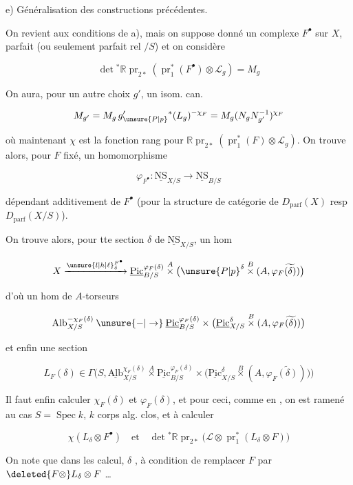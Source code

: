 
e) Généralisation des constructions précédentes.

On revient aux conditions de a), mais on suppose donné un complexe  $F^{\bullet}$ sur $X$,  parfait (ou seulement parfait rel $/S$) et on considère

\[
\det{}^{*}\mathbb R\operatorname{pr}_{2*}(\operatorname{pr}_1^{*}(F^{\bullet})\otimes\mathscr L_g)=M_g
\]

On aura, pour un autre choix $g'$,  un isom. can.

\[
M_{g'}=M_g\,g'_{\unsure{P|p}}{}^{*}(L_g)^{-\chi_F}=M_g(N_gN_{g'}^{-1})^{\chi_F}
\]

où maintenant $\chi$ est la fonction rang pour $\mathbb R\operatorname{pr}_{2*}(\operatorname{pr}_1^{*}(F)\otimes\mathscr L_g)$. On trouve alors, pour $F$ fixé, un homomorphisme

\[
\varphi_{F^{\bullet}}\colon\underline{\mathrm{NS}}_{X/S}\longrightarrow\underline{\mathrm{NS}}_{B/S}
\]

dépendant additivement de $F^{\bullet}$ (pour la structure de catégorie  de $D_{\mathrm{parf}}(X)$ resp $D_{\mathrm{parf}}(X/S)$).

On trouve alors, pour tte section $\delta$ de $\underline{\mathrm{NS}}_{X/S}$, un hom

\[
X\xrightarrow{{\unsure{l|h|\ell}}_{\delta}^{F^{\bullet}}}\underline{\mathrm{Pic}}^{\varphi_F(\delta)}_{B/S}\overset{A}{\times}\bigl({\unsure{P|p}}^{\delta}\overset{B}{\times}(A,\varphi_F\widetilde{(\delta)})\bigr)
\]

d'où un hom de $A$-torseurs

\[
\mathrm{Alb}^{-\chi_F(\delta)}_{X/S}\mathbin{\unsure{-|\to}}\underline{\mathrm{Pic}}^{\varphi_F(\delta)}_{B/S}\times\bigl(\underline{\mathrm{Pic}}^{\delta}_{X/S}\overset{B}{\times}(A,\varphi_F\widetilde{(\delta)})\bigr)
\]

et enfin une section

\[
\boxed{L_F(\delta)\in\Gamma\bigl(S,\underline{\mathrm{Alb}}_{X/S}^{\chi_F(\delta)}\overset{A}{\times}\underline{\mathrm{Pic}}_{B/S}^{\varphi_F(\delta)}\times\bigl(\underline{\mathrm{Pic}}_{X/S}^{\delta}\overset{B}{\times}(A,\varphi_F\widetilde{(\delta)})\bigr)\bigr)}
\]

Il faut enfin calculer $\chi_F(\delta)$ et $\varphi_F(\delta)$, et pour ceci, comme en , on est ramené au cas $S=\operatorname{Spec} k$, $k$ corps alg. clos, et à calculer

\[
\chi(L_\delta\otimes F^{\bullet})\quad\text{et}\quad\det{}^{*}\mathbb R\operatorname{pr}_{2*}\bigl(\mathscr L\otimes\operatorname{pr}_1^{*}(L_\delta\otimes F)\bigr)
\]

On note que dans les calcul, $\delta$ , à condition de remplacer $F$ par $\deleted{F\otimes}L_\delta\otimes F$ \ldots{}
